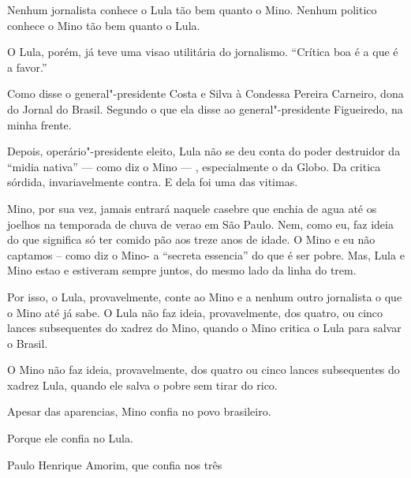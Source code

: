 



Nenhum jornalista conhece o Lula tão bem quanto o Mino.
Nenhum politico conhece o Mino tão bem quanto o Lula.

O Lula, porém, já teve uma visao utilitária do jornalismo.
“Crítica boa é a que é a favor.”

Como disse o general"-presidente Costa e Silva à Condessa Pereira Carneiro, dona do Jornal do Brasil.
Segundo o que ela disse ao general"-presidente Figueiredo, na minha frente.

Depois, operário"-presidente eleito, Lula não se deu conta do poder destruidor da “midia nativa” — como diz o Mino — , especialmente o da Globo.
Da critica sórdida, invariavelmente contra.
E dela foi uma das vitimas.

Mino, por sua vez, jamais entrará naquele casebre que enchia de agua até os joelhos na temporada de chuva de verao em São Paulo.
Nem, como eu, faz ideia do que significa só ter comido pão aos treze anos de idade.
O Mino e eu não captamos – como diz o Mino- a “secreta essencia” do que é ser pobre.
Mas, Lula e Mino estao e estiveram sempre juntos, do mesmo lado da linha do trem.

Por isso, o Lula, provavelmente, conte ao Mino e a nenhum outro jornalista o que o Mino até já sabe.
O Lula não faz ideia, provavelmente, dos quatro, ou cinco lances subsequentes do xadrez do Mino, quando o Mino critica o Lula para salvar o Brasil.

O Mino não faz ideia, provavelmente, dos quatro ou cinco lances subsequentes do xadrez Lula, quando ele salva o pobre sem tirar do rico.

Apesar das aparencias, Mino confia no povo brasileiro.

Porque ele confia no Lula.
\medskip

Paulo Henrique Amorim, que confia nos três





